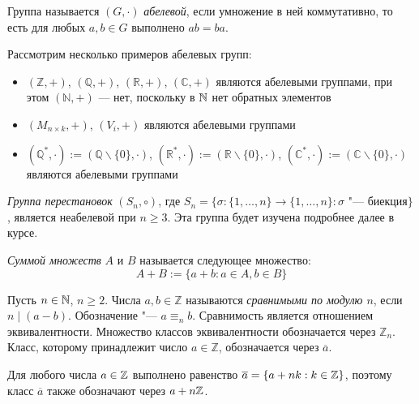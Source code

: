 \begin{definition}
	Группа называется $(G, \cdot)$ \textit{абелевой}, если умножение в ней коммутативно, то есть для любых $a, b \in G$ выполнено $ab = ba$.
\end{definition}

\begin{example}
	Рассмотрим несколько примеров абелевых групп:
	\begin{itemize}
		\item $(\mathbb{Z}, +)$, $(\mathbb{Q}, +)$, $(\mathbb{R}, +)$, $(\mathbb{C}, +)$ являются абелевыми группами, при этом $(\mathbb{N}, +)$ --- нет, поскольку в $\mathbb{N}$ нет обратных элементов
		\item $(M_{n \times k}, +)$, $(V_i, +)$ являются абелевыми группами
		\item $(\mathbb{Q}^*, \cdot) := (\mathbb{Q} \backslash \{0\}, \cdot)$, $ (\mathbb{R}^*, \cdot) := (\mathbb{R} \backslash \{0\}, \cdot)$, $(\mathbb{C}^*, \cdot) := (\mathbb{C} \backslash \{0\}, \cdot)$ являются абелевыми группами
	\end{itemize}
\end{example}

\begin{example}
	\textit{Группа перестановок} $(S_n, \circ)$, где $S_n = \{\sigma: \{1,\dots, n\} \rightarrow \{1,\dots, n\}: \sigma \text{ "--- биекция}\}$, является неабелевой при $n \ge 3$. Эта группа будет изучена подробнее далее в курсе.
\end{example}

\begin{definition}
	\textit{Суммой множеств} $A$ и $B$ называется следующее множество:
	\[A + B := \{a + b: a \in A, b \in B\}\]
\end{definition}

\begin{definition}
	Пусть $n \in \mathbb{N}$, $n \ge 2$. Числа $a, b \in \mathbb{Z}$ называются \textit{сравнимыми по модулю $n$}, если $n \mid (a - b)$. Обозначение "--- $a \equiv_n b$. Сравнимость является отношением эквивалентности. Множество классов эквивалентности обозначается через $\mathbb{Z}_n$. Класс, которому принадлежит число $a \in \mathbb{Z}$, обозначается через $\overline{a}$.
\end{definition}

\begin{note}
	Для любого числа $a \in \mathbb{Z}$ выполнено равенство $\overline{a} = \{a + nk: k \in \mathbb{Z}\}$, поэтому класс $\overline{a}$ также обозначают через $a + n\mathbb{Z}$.
\end{note}

